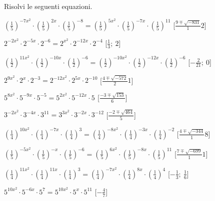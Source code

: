 \begin{esercizio}\label{ese:}
 Risolvi le seguenti equazioni.
 \begin{enumeratea}
  \item  \(\left(\frac{1}{5}\right)^{-7x^2} \cdot \left(\frac{1}{5}\right)^{2x} 
\cdot \left(\frac{1}{5}\right)^{-8} = \left(\frac{1}{5}\right)^{5x^2} \cdot 
\left(\frac{1}{5}\right)^{-7x} \cdot \left(\frac{1}{5}\right)^{11}\)
   \hfill [\(\frac{9 \mp \sqrt{-831}} 12\)]
  \item  \(2^{-2x^2} \cdot 2^{-5x} \cdot 2^{-6} = 2^{x^2} \cdot 2^{-12x} \cdot 
2^{-4}\)
   \hfill [\(\frac{1}{3};~2\)]
  \item  \(\left(\frac{1}{2}\right)^{11x^2} \cdot 
\left(\frac{1}{2}\right)^{-10x} \cdot \left(\frac{1}{2}\right)^{-6} = 
\left(\frac{1}{2}\right)^{-10x^2} \cdot \left(\frac{1}{2}\right)^{-12x} \cdot 
\left(\frac{1}{2}\right)^{-6}\)
   \hfill [\(-\frac{2}{21};~0\)]
  \item  \(2^{9x^2} \cdot 2^{x} \cdot 2^{-3} = 2^{-12x^2} \cdot 2^{5x} \cdot 
2^{-10}\)
   \hfill [\(\frac{4 \mp \sqrt{-572}} 21\)]
  \item  \(5^{8x^2} \cdot 5^{-9x} \cdot 5^{-5} = 5^{2x^2} \cdot 5^{-12x} \cdot 
5^{}\)
   \hfill [\(\frac{-3 \mp \sqrt{153}} 6\)]
  \item  \(3^{-2x^2} \cdot 3^{-4x} \cdot 3^{11} = 3^{3x^2} \cdot 3^{-2x} \cdot 
3^{-12}\)
   \hfill [\(\frac{-2 \mp \sqrt{464}} 5\)]
  \item  \(\left(\frac{1}{4}\right)^{10x^2} \cdot 
\left(\frac{1}{4}\right)^{-7x} \cdot \left(\frac{1}{4}\right)^{3} = 
\left(\frac{1}{4}\right)^{-8x^2} \cdot \left(\frac{1}{4}\right)^{-3x} \cdot 
\left(\frac{1}{4}\right)^{-2}\)
   \hfill [\(\frac{4 \mp \sqrt{-344}} 18\)]
  \item  \(\left(\frac{1}{5}\right)^{-5x^2} \cdot \left(\frac{1}{5}\right)^{-x} 
\cdot \left(\frac{1}{5}\right)^{-6} = \left(\frac{1}{5}\right)^{6x^2} \cdot 
\left(\frac{1}{5}\right)^{-8x} \cdot \left(\frac{1}{5}\right)^{11}\)
   \hfill [\(\frac{7 \mp \sqrt{-699}} 11\)]
  \item  \(\left(\frac{1}{4}\right)^{11x^2} \cdot 
\left(\frac{1}{4}\right)^{11x} \cdot \left(\frac{1}{4}\right)^{3} = 
\left(\frac{1}{4}\right)^{-7x^2} \cdot \left(\frac{1}{4}\right)^{8x} \cdot 
\left(\frac{1}{4}\right)^{4}\)
   \hfill [\(-\frac{1}{3};~\frac{1}{6}\)]
  \item  \(5^{10x^2} \cdot 5^{-6x} \cdot 5^{7} = 5^{10x^2} \cdot 5^{x} \cdot 
5^{11}\)
   \hfill [\(-\frac{4}{7}\)]

\end{enumeratea}
\end{esercizio}
